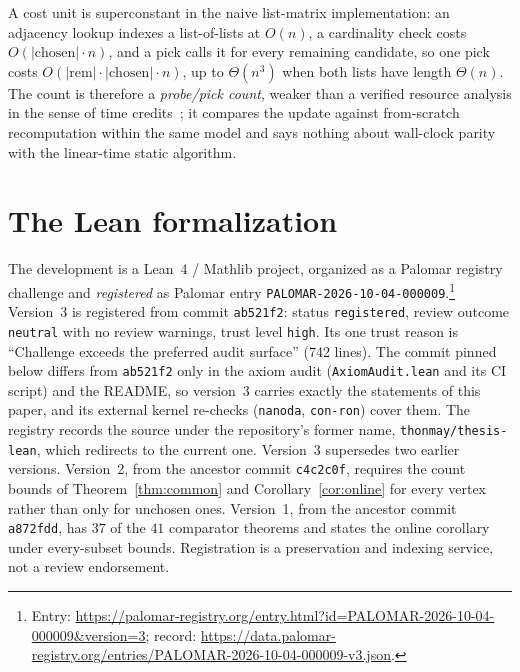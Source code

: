 \documentclass[11pt]{article}
\theoremstyle{definition}
\theoremstyle{remark}
\newcommand{\leanname}[1]{%
  \texttt{\begingroup\def\_{\textunderscore\allowbreak}#1\endgroup}}
\begin{document}
A cost unit is superconstant in the naive list-matrix implementation: an
adjacency lookup indexes a list-of-lists at $O(n)$, a cardinality check costs
$O(|\text{chosen}|\cdot n)$, and a pick calls it for every remaining candidate,
so one pick costs $O(|\text{rem}|\cdot|\text{chosen}|\cdot n)$, up to
$\Theta(n^{3})$ when both lists have length $\Theta(n)$. The count is therefore
a \emph{probe/pick count}, weaker than a verified resource analysis in the sense of time
credits~\cite{gueneau2019formal}; it compares the update against from-scratch
recomputation within the same model and says nothing about wall-clock parity with
the linear-time static algorithm.

\section{The Lean formalization}
\label{sec:formalization}

The development is a Lean~4 / Mathlib project, organized as a Palomar registry
challenge and \emph{registered} as Palomar entry
\leanname{PALOMAR-2026-10-04-000009}.\footnote{Entry:
\url{https://palomar-registry.org/entry.html?id=PALOMAR-2026-10-04-000009&version=3};\newline
record: \url{https://data.palomar-registry.org/entries/PALOMAR-2026-10-04-000009-v3.json}.}
Version~3 is registered from commit \texttt{ab521f2}: status
\texttt{registered}, review outcome \texttt{neutral} with no review warnings,
trust level \texttt{high}. Its one trust reason is ``Challenge exceeds the
preferred audit surface'' (742 lines). The commit pinned below differs from
\texttt{ab521f2} only in the axiom audit (\texttt{AxiomAudit.lean} and its CI
script) and the README, so version~3 carries exactly the statements of this
paper, and its external kernel re-checks (\texttt{nanoda}, \texttt{con-ron})
cover them. The registry records
the source under the repository's former name, \texttt{thonmay/thesis-lean},
which redirects to the current one. Version~3 supersedes two earlier versions.
Version~2, from the ancestor commit \texttt{c4c2c0f}, requires the count bounds
of Theorem~\ref{thm:common} and Corollary~\ref{cor:online} for every vertex
rather than only for unchosen ones. Version~1, from the ancestor commit
\texttt{a872fdd}, has $37$ of the $41$ comparator theorems and states the online
corollary under every-subset bounds. Registration is a preservation and indexing service,
not a review endorsement.
\end{document}
